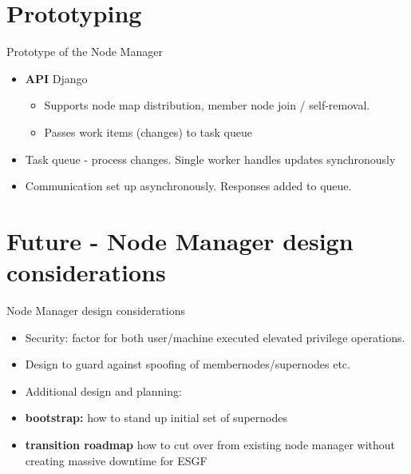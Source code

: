 \documentclass{beamer}
\begin{document}
\section{Prototyping}
\begin{frame}{Prototype of the Node Manager}
\begin{itemize}
\item
\textbf{API} Django
\begin{itemize}
 \item Supports node map distribution, member node join / self-removal.
\item
Passes work items (changes) to task queue
\end{itemize}
\item Task queue  - process changes.  Single worker handles updates synchronously

\item
Communication set up asynchronously. Responses added to queue.  

\end{itemize}

\end{frame}





\section{Future - Node Manager design considerations}
\begin{frame}{Node Manager design considerations}
\begin{itemize}
\item Security: factor for both user/machine executed elevated privilege operations.
\item Design to guard against spoofing of membernodes/supernodes etc.
\item 
Additional design and planning:
\item
\textbf{bootstrap:} how to stand up initial set of supernodes
\item
\textbf{transition roadmap} how to cut over from existing node manager without creating massive downtime for ESGF


\end{itemize}
\end{frame}
\end{document}

